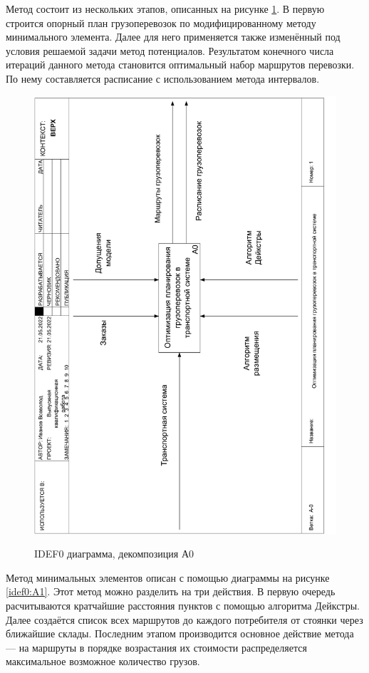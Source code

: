 Метод состоит из нескольких этапов, описанных на рисунке \ref{idef0:A0}. В первую строится опорный план грузоперевозок по модифицированному методу минимального элемента. Далее для него применяется также изменённый под условия решаемой задачи метод потенциалов. Результатом конечного числа итераций данного метода становится оптимальный набор маршрутов перевозки. По нему составляется расписание с использованием метода интервалов.

\begin{figure}[h]
	\begin{center}
		{\includegraphics[scale=0.63, angle=-90, page=2]{img/idef0.pdf}}
		\caption{IDEF0 диаграмма, декомпозиция А0}
		\label{idef0:A0}
	\end{center}
\end{figure}

Метод минимальных элементов описан с помощью диаграммы на рисунке \ref{idef0:A1}. Этот метод можно разделить на три действия. В первую очередь расчитываются кратчайшие расстояния пунктов с помощью алгоритма Дейкстры. Далее создаётся список всех маршрутов до каждого потребителя от стоянки через ближайшие склады. Последним этапом производится основное действие метода --- на маршруты в порядке возрастания их стоимости распределяется максимальное возможное количество грузов. 

